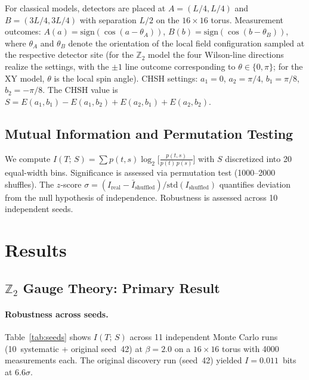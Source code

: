\documentclass[aps,pra,twocolumn,superscriptaddress,showpacs,floatfix]{revtex4-2}
\newcommand{\Ztwo}{\mathbb{Z}_2}
\newcommand{\MI}{I(T;\,S)}
\begin{document}
For classical models, detectors are placed at $A = (L/4, L/4)$ and
$B = (3L/4, 3L/4)$ with separation $L/2$ on the $16 \times 16$ torus.
Measurement outcomes:
$A(a) = \mathrm{sign}(\cos(a - \theta_A))$,
$B(b) = \mathrm{sign}(\cos(b - \theta_B))$,
where $\theta_A$ and $\theta_B$ denote the orientation of the local field
configuration sampled at the respective detector site (for the $\Ztwo$ model
the four Wilson-line directions realize the settings, with the $\pm1$ line
outcome corresponding to $\theta \in \{0,\pi\}$; for the XY model, $\theta$
is the local spin angle).
CHSH settings: $a_1 = 0$, $a_2 = \pi/4$, $b_1 = \pi/8$, $b_2 = -\pi/8$.
The CHSH value is
$S = E(a_1,b_1) - E(a_1,b_2) + E(a_2,b_1) + E(a_2,b_2)$.

\subsection{Mutual Information and Permutation Testing}

We compute
$\MI = \sum p(t,s) \log_2\!\big[\tfrac{p(t,s)}{p(t)\,p(s)}\big]$
with $S$ discretized into 20 equal-width bins. Significance is assessed via
permutation test (1000--2000 shuffles). The $z$-score
$\sigma = (I_\mathrm{real} - \bar{I}_\mathrm{shuffled}) / \mathrm{std}(I_\mathrm{shuffled})$
quantifies deviation from the null hypothesis of independence. Robustness is
assessed across 10 independent seeds.

\section{Results}
\label{sec:results}

\subsection{$\Ztwo$ Gauge Theory: Primary Result}

\paragraph{Robustness across seeds.}
Table~\ref{tab:seeds} shows $\MI$ across 11 independent Monte Carlo runs
(10~systematic + original seed~42) at $\beta = 2.0$ on a $16 \times 16$ torus
with 4000 measurements each. The original discovery run (seed~42) yielded
$I = 0.011$~bits at $6.6\sigma$.
\end{document}
